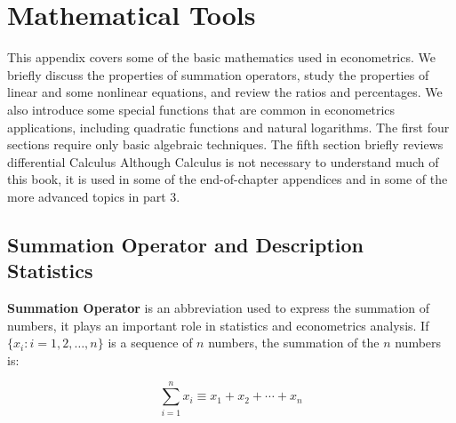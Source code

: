\documentclass[11pt]{boyogalaelegantbook}
\begin{document}
\nocite{en2,en3}

\printbibliography[heading=bibintoc, title=\ebibname]
\appendix


\chapter{Mathematical Tools}

This appendix covers some of the basic mathematics used in econometrics. We briefly discuss the properties of summation operators, study the properties of linear and some nonlinear equations, and review the ratios and percentages. We also introduce some special functions that are common in econometrics applications, including quadratic functions and natural logarithms. The first four sections require only basic algebraic techniques. The fifth section briefly reviews differential Calculus Although Calculus is not necessary to understand much of this book, it is used in some of the end-of-chapter appendices and in some of the more advanced topics in part 3.

\section{Summation Operator and Description Statistics}

\textbf{Summation Operator} is an abbreviation used to express the summation of numbers, it plays an important role in statistics and econometrics analysis. If $\{x_i: i=1, 2, \ldots, n\}$ is a sequence of $n$ numbers, the summation of the $n$ numbers is:

\begin{equation}
\sum_{i=1}^n x_i \equiv x_1 + x_2 +\cdots + x_n
\end{equation}
\end{document}

